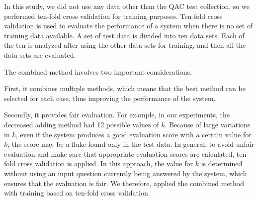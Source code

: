 \begin{itemize}
  In this study, we did not use any data other than the QAC test collection, 
  so we performed ten-fold cross validation for training purposes.
  Ten-fold cross validation is used to evaluate the performance of a system 
  when there is no set of training data available. 
  A set of test data is divided into ten data sets. 
  Each of the ten is analyzed after using the other data sets for training, 
  and then all the data sets are evaluated.

  The combined method involves two important considerations.

  First, it combines multiple methods, which 
  means that the best method can be selected for each case, 
  thus improving the performance of the system. 

  Secondly, it provides fair evaluation. 
  For example, in our experiments, the decreased adding method had
  12 possible values of $k$. 
  Because of large variations in $k$, 
  even if the system produces a good evaluation score with a certain value for $k$, 
  the score may be a fluke found only in the test data. 
  In general, to avoid unfair evaluation and 
  make sure that appropriate evaluation scores are calculated, 
  ten-fold cross validation is applied. 
  In this approach, 
  the value for $k$ is determined without using 
  an input question currently being answered by the system, 
  which ensures that 
  the evaluation is fair. 
  We therefore, applied the combined method 
  with training based on ten-fold cross validation. 

\end{itemize}


